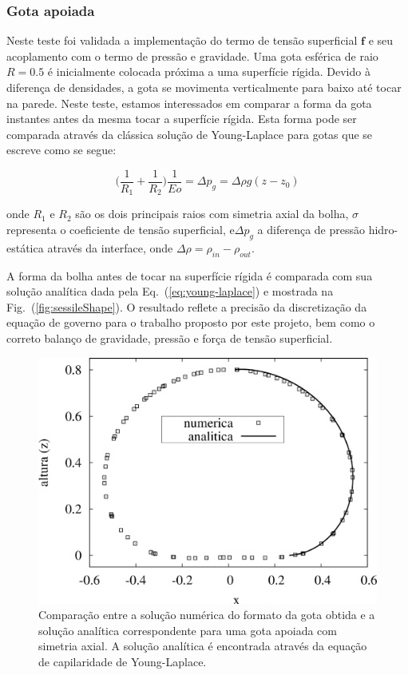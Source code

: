 \documentclass[a4paper,portuges,12pt]{article}
\newcommand{\fvet}{\mathbf{f}}
\begin{document}
\subsubsection{Gota apoiada}

Neste teste foi validada a implementação do termo de tensão superficial
$\fvet$ e seu acoplamento com o termo de pressão e gravidade. Uma gota
esférica de raio $R=0.5$ é inicialmente colocada próxima a uma
superfície rígida. Devido à diferença de densidades, a gota se movimenta
verticalmente para baixo até tocar na parede. Neste teste, estamos
interessados em comparar a forma da gota instantes antes da mesma tocar
a superfície rígida. Esta forma pode ser comparada através da
clássica solução de Young-Laplace para gotas que se escreve como se
segue:

\begin{equation}
	\big( \frac{1}{R_1}+\frac{1}{R_2} \big)\frac{1}{Eo}
	=
	\Delta p_g
	=
	\Delta \rho g (z-z_0)
	\label{eq:young-laplace}
\end{equation}

\noindent onde $R_1$ e $R_2$ são os dois principais raios com simetria
axial da bolha, $\sigma$ representa o coeficiente de tensão superficial,
e$\Delta p_g$ a diferença de pressão hidro-estática através da
interface, onde $\Delta \rho = \rho_{in}-\rho_{out}$. 

A forma da bolha antes de tocar na superfície rígida é comparada com sua
solução analítica dada pela Eq.~(\ref{eq:young-laplace}) e mostrada na 
Fig.~(\ref{fig:sessileShape}). O resultado reflete a precisão da
discretização da equação de governo para o trabalho proposto por este
projeto, bem como o correto balanço de gravidade, pressão e força de
tensão superficial.

 \begin{figure}[h!]
 	\begin{center}
 		\includegraphics[angle=0, scale=0.5]{figs/sessileShape.pdf}
 	\end{center}
	\caption{Comparação entre a solução numérica do formato da gota
	obtida e a solução
	analítica correspondente para uma gota apoiada com simetria axial.
	A solução analítica é encontrada através da equação de capilaridade
	de Young-Laplace.}
 	\label{fig:sessile} 
 \end{figure}
\end{document}
